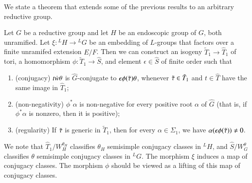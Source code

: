 We state a theorem that extends some of the previous results to an arbitrary reductive group.

\begin{theorem}
Let $G$ be a reductive group and let $H$ be an endoscopic group of $G$, both unramified.
Let $\xi:{}^LH\to {}^LG$ be an embedding of $L$-groups that factors over a finite
unramifed extension $E/F$.  Then we can construct an isogeny $\tilde T_1\to \hat T_1$ of tori,
a homomorphism $\phi:\tilde T_1\to \hat S$, and element $\epsilon\in \hat S$ of finite order
such that
\begin{enumerate}
\item (conjugacy) $t\dot w\theta$ is $\hat G$-conjugate to $\epsilon\phi(\tilde\tau) \theta$,
whenever $\tilde\tau\in \tilde T_1$ and $t\in \hat T$ have the same image in $\hat T_1$;
\item  (non-negativity) $\phi^*\alpha$ is non-negative for every positive
root $\alpha$ of $\hat G$ (that is, if $\phi^*\alpha$ is nonzero, then it is positive);
\item  (regularity) If $\tilde\tau$ is generic in $\tilde T_1$, then for every $\alpha\in\Sigma_1$, we have $\alpha(\epsilon\phi(\tilde\tau))\ne 0$.
\end{enumerate}
\end{theorem}

We note that $\hat T_1/W_H^{\theta_H}$ classifies $\theta_H$ semisimple conjugacy classes in ${}^LH$,
 and $\hat S/W_G^{\theta}$ classifies $\theta$
semisimple conjugacy classes in ${}^LG$.  The morphism $\xi$ induces a map of conjugacy classes.
The morphism $\phi$ should be viewed as a lifting of this map of conjugacy classes.



